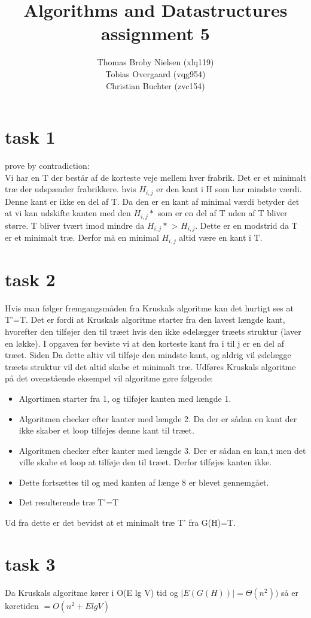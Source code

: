\documentclass[12pt]{article}
\title{Algorithms and Datastructures assignment 5}
\author{Thomas Broby Nielsen (xlq119)\\ Tobias Overgaard (vqg954)\\ Christian Buchter (zvc154)}
\begin{document}
\maketitle
\section*{task 1}
prove by contradiction:\\
Vi har en T der består af de korteste veje mellem hver frabrik. Det er et minimalt træ der udspænder frabrikkere. hvis $H_{i,j}$ er den kant i H som har mindste værdi. Denne kant er ikke en del af T. Da den er en kant af minimal værdi betyder det at vi kan udskifte kanten med den $H_{i,j}*$ som er en del af T uden af T bliver større. T bliver tvært imod mindre da  $H_{i,j}*$ > $H_{i,j}$. Dette er en modstrid da T er et minimalt træ. Derfor må en minimal $H_{i,j}$ altid være en kant i T.

\newpage
\section*{task 2}
Hvis man følger fremgangsmåden fra Kruskals algoritme kan det hurtigt ses at T'=T. Det er fordi at Kruskals algoritme starter fra den lavest længde kant, hvorefter den tilføjer den til træet hvis den ikke ødelægger træets struktur (laver en løkke). I opgaven før beviste vi at den korteste kant fra i til j er en del af træet. Siden Da dette altiv vil tilføje den mindste kant, og aldrig vil ødelægge træets struktur vil det altid skabe et minimalt træ. Udføres Kruskals  algoritme på det ovenstående eksempel vil algoritme gøre følgende:
\begin{itemize}
\item Algortimen starter fra 1, og tilføjer kanten med længde 1.
\item Algoritmen checker efter kanter med længde 2. Da der er sådan en kant der ikke skaber et loop tilføjes denne kant til træet.
\item Algoritmen checker efter kanter med længde 3. Der er sådan en kan,t men det ville skabe et loop at tilføje den til træet. Derfor tilføjes kanten ikke.
\item Dette fortsættes til og med kanten af længe 8 er blevet gennemgået.
\item Det resulterende træ T'=T
\end{itemize}
Ud fra dette er det bevidst at et minimalt træ T' fra G(H)=T.
\newpage
\section*{task 3}
Da Kruskals algoritme kører i O(E lg V) tid og  $|E(G(H))|=\Theta(n^2))$ så er køretiden $= O(n^2+E lg V)$
\end{document}
